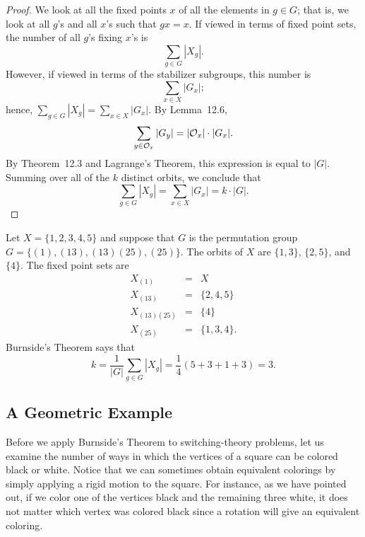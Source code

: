  
\begin{proof}
We look at all the fixed points $x$ of all the elements in $g \in G$;
that is, we look at all $g$'s and all $x$'s such that $gx =x$.
If viewed in terms of fixed point sets, the number of all $g$'s fixing
$x$'s is 
$$
\sum_{g \in G} |X_g|.
$$
However, if viewed in terms of the stabilizer subgroups, this number
is 
$$
\sum_{x \in X} |G_x|;
$$
hence, $\sum_{g \in G} |X_g| = \sum_{x \in X} |G_x|$. By Lemma~12.6, 
$$
\sum_{y \in {\cal O}_x} |G_y|  =  | {\cal O}_x| \cdot |G_x|.
$$
By Theorem~12.3 and Lagrange's Theorem, this expression is equal 
to $|G|$. Summing over all of the $k$ distinct orbits, we conclude that
$$
\sum_{g \in G} |X_g| = \sum_{x \in X} |G_x| = k \cdot |G|.
$$
\end{proof}
 
 
\medskip
 
 
\begin{example}
Let $X = \{1, 2, 3, 4, 5 \}$ and suppose that $G$ is the permutation
group $G= \{(1), (1 3), (1 3)(2 5), (2 5) \}$. The orbits of $X$ are
$\{1, 3\}$, $\{2, 5\}$, and $\{4\}$. The fixed point sets are 
\begin{eqnarray*}
X_{(1)} & = & X \\
X_{(1 3)} & = & \{2, 4, 5 \} \\
X_{(1 3)(2 5)} & = & \{4\} \\
X_{(2 5)} & = & \{1, 3, 4 \} .
\end{eqnarray*}
Burnside's Theorem says that
$$
k = \frac{1}{|G|} \sum_{g \in G} |X_g| = \frac{1}{4}(5+
3+1+3) = 3.
$$
\end{example}
 
 
 
\subsection*{A Geometric Example}
 
 
 
Before we apply Burnside's Theorem to switching-theory problems, let
us examine the number of ways in which the vertices of a square can be
colored black or white. Notice that we can sometimes obtain equivalent
colorings by simply applying a rigid motion to the square. For
instance, as we have pointed out, if we color one of the vertices
black and the remaining three white, it does not matter which vertex
was colored black since a rotation will give an equivalent coloring.  
 
